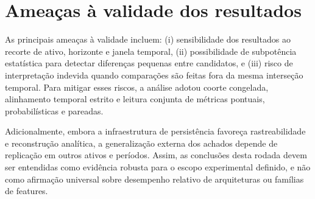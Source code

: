 \section{Ameaças à validade dos resultados}
As principais ameaças à validade incluem: (i) sensibilidade dos resultados ao recorte de ativo, horizonte e janela temporal, (ii) possibilidade de subpotência estatística para detectar diferenças pequenas entre candidatos, e (iii) risco de interpretação indevida quando comparações são feitas fora da mesma interseção temporal. Para mitigar esses riscos, a análise adotou coorte congelada, alinhamento temporal estrito e leitura conjunta de métricas pontuais, probabilísticas e pareadas.

Adicionalmente, embora a infraestrutura de persistência favoreça rastreabilidade e reconstrução analítica, a generalização externa dos achados depende de replicação em outros ativos e períodos. Assim, as conclusões desta rodada devem ser entendidas como evidência robusta para o escopo experimental definido, e não como afirmação universal sobre desempenho relativo de arquiteturas ou famílias de features.
